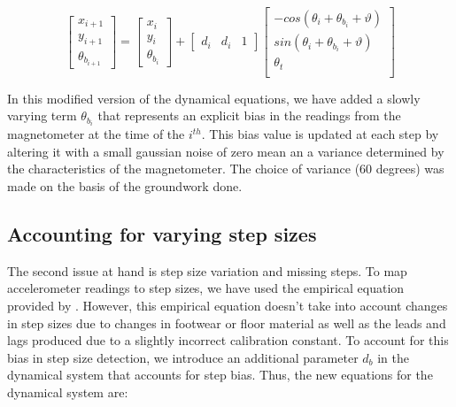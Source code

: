 \begin{equation}
\begin{bmatrix}x_{i+1}\\
y_{i+1}\\
\theta_{b_{i+1}}
\end{bmatrix} = \begin{bmatrix}x_{i}\\
y_{i}\\
\theta_{b_i}
\end{bmatrix}  + \begin{bmatrix} d{}_{i} & d_i & 1 \end{bmatrix} \begin{bmatrix}-cos(\theta_{i}+\theta_{b_i}+\vartheta)\\
sin(\theta_{i}+\theta_{b_i}+\vartheta)\\
\theta_t\\
\end{bmatrix} 
\end{equation}

In this modified version of the dynamical equations, we have added a slowly
varying term $\theta_{b_i}$ that represents an explicit bias in the readings from
the magnetometer at the time of the $i^{th}$. This bias value is updated at 
each step by altering it with a small gaussian noise of zero mean an a variance
determined by the characteristics of the magnetometer. The choice of 
variance (60 degrees) was made on the basis of the groundwork done. 

\subsection{Accounting for varying step sizes}

The second issue at hand is step size variation and missing steps. To map
accelerometer readings to step sizes, we have used the empirical equation
provided by \cite{ADXL202}. However, this empirical equation doesn't take into account
changes in step sizes due to changes in footwear or floor material as well as the 
leads and lags produced due to a slightly incorrect calibration constant. To account
for this bias in step size detection, we introduce an additional parameter
$d_{b}$ in the dynamical system that accounts for step bias. 
Thus, the new equations for the dynamical system are:

